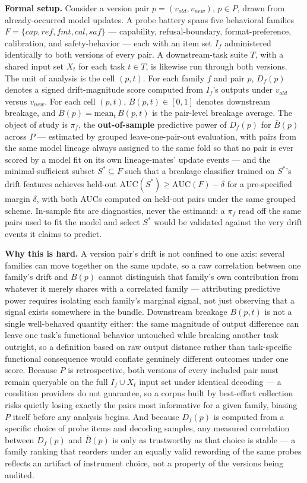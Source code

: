 \documentclass[11pt]{article}
\begin{document}
\noindent\textbf{Formal setup.} Consider a version pair $p = (v_{old}, v_{new})$, $p \in P$, drawn from already-occurred model updates. A probe battery spans five behavioral families $F = \{cap, ref, fmt, cal, saf\}$ --- capability, refusal-boundary, format-preference, calibration, and safety-behavior --- each with an item set $I_f$ administered identically to both versions of every pair. A downstream-task suite $T$, with a shared input set $X_t$ for each task $t \in T$, is likewise run through both versions. The unit of analysis is the cell $(p, t)$. For each family $f$ and pair $p$, $D_f(p)$ denotes a signed drift-magnitude score computed from $I_f$'s outputs under $v_{old}$ versus $v_{new}$. For each cell $(p,t)$, $B(p,t) \in [0,1]$ denotes downstream breakage, and $\bar{B}(p) = \text{mean}_t\, B(p,t)$ is the pair-level breakage average. The object of study is $\pi_f$, the \textbf{out-of-sample} predictive power of $D_f(p)$ for $\bar{B}(p)$ across $P$ --- estimated by grouped leave-one-pair-out evaluation, with pairs from the same model lineage always assigned to the same fold so that no pair is ever scored by a model fit on its own lineage-mates' update events --- and the minimal-sufficient subset $S^* \subseteq F$ such that a breakage classifier trained on $S^*$'s drift features achieves held-out $\text{AUC}(S^*) \geq \text{AUC}(F) - \delta$ for a pre-specified margin $\delta$, with both AUCs computed on held-out pairs under the same grouped scheme. In-sample fits are diagnostics, never the estimand: a $\pi_f$ read off the same pairs used to fit the model and select $S^*$ would be validated against the very drift events it claims to predict.

\noindent\textbf{Why this is hard.} A version pair's drift is not confined to one axis: several families can move together on the same update, so a raw correlation between one family's drift and $\bar{B}(p)$ cannot distinguish that family's own contribution from whatever it merely shares with a correlated family --- attributing predictive power requires isolating each family's marginal signal, not just observing that a signal exists somewhere in the bundle. Downstream breakage $B(p,t)$ is not a single well-behaved quantity either: the same magnitude of output difference can leave one task's functional behavior untouched while breaking another task outright, so a definition based on raw output distance rather than task-specific functional consequence would conflate genuinely different outcomes under one score. Because $P$ is retrospective, both versions of every included pair must remain queryable on the full $I_f \cup X_t$ input set under identical decoding --- a condition providers do not guarantee, so a corpus built by best-effort collection risks quietly losing exactly the pairs most informative for a given family, biasing $P$ itself before any analysis begins. And because $D_f(p)$ is computed from a specific choice of probe items and decoding samples, any measured correlation between $D_f(p)$ and $\bar{B}(p)$ is only as trustworthy as that choice is stable --- a family ranking that reorders under an equally valid rewording of the same probes reflects an artifact of instrument choice, not a property of the versions being audited.
\end{document}
